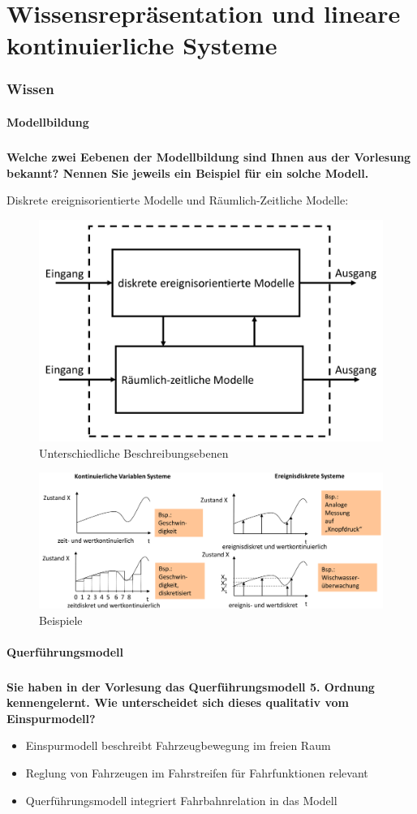 \part{Wissensrepräsentation und lineare kontinuierliche Systeme}
\section{Wissen}
\subsection{Modellbildung}
\subsubsection{}
\textbf{Welche zwei Eebenen der Modellbildung sind Ihnen aus der Vorlesung bekannt? Nennen Sie jeweils ein Beispiel für ein solche Modell.}

Diskrete ereignisorientierte Modelle und Räumlich-Zeitliche Modelle:
\begin{figure}[H]
    \centering
    \includegraphics[width=.4\linewidth]{Graphics/Modellbildung_Ebenen.png}
    \caption{Unterschiedliche Beschreibungsebenen}
\end{figure}
\begin{figure}[H]
    \centering
    \includegraphics[width=.6\linewidth]{Graphics/Beispiel_Modell.png}
    \caption{Beispiele}
\end{figure}

\subsection{Querführungsmodell}
\subsubsection{}
\textbf{Sie haben in der Vorlesung das Querführungsmodell 5. Ordnung kennengelernt. Wie unterscheidet sich dieses qualitativ vom Einspurmodell?}
\begin{itemize}
    \item Einspurmodell beschreibt Fahrzeugbewegung im freien Raum
    \item Reglung von Fahrzeugen im Fahrstreifen für Fahrfunktionen relevant
    \item Querführungsmodell integriert Fahrbahnrelation in das Modell
\end{itemize}

